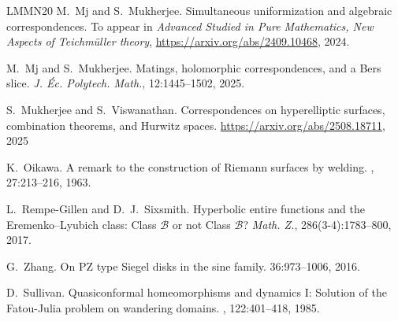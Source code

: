 \documentclass[11pt,a4paper, oneside]{amsart}
\theoremstyle{definition}
\theoremstyle{remark}
\numberwithin{equation}{section}
\begin{document}
\begin{thebibliography}{LMMN20}
M.~Mj and S.~Mukherjee.
\newblock Simultaneous uniformization and algebraic correspondences.
\newblock To appear in {\em Advanced Studied in Pure Mathematics, New Aspects of Teichmüller theory}, \url{https://arxiv.org/abs/2409.10468}, 2024.

M.~Mj and S.~Mukherjee.
\newblock Matings, holomorphic correspondences, and a Bers slice. 
\newblock \emph{J. {\'E}c. Polytech. Math.}, 12:1445--1502, 2025.

S.~Mukherjee and S.~Viswanathan.
\newblock Correspondences on hyperelliptic surfaces, combination theorems, and Hurwitz spaces.
\newblock \url{https://arxiv.org/abs/2508.18711}, 2025

K.~Oikawa.
\newblock A remark to the construction of Riemann surfaces by welding.
, 27:213–216, 1963.

L.~Rempe-Gillen and D.~J.~Sixsmith.
\newblock Hyperbolic entire functions and the Eremenko--Lyubich class: Class $\mathcal B$ or not Class $\mathcal B$?
\newblock \emph{Math. Z.}, 286(3-4):1783–800, 2017.

G.~Zhang.
\newblock On PZ type Siegel disks in the sine family.
 36:973--1006, 2016.

D.~Sullivan.
\newblock Quasiconformal homeomorphisms and dynamics {I}: Solution of the
{F}atou-{J}ulia problem on wandering domains.
, 122:401--418, 1985.

\end{thebibliography}
\end{document}
